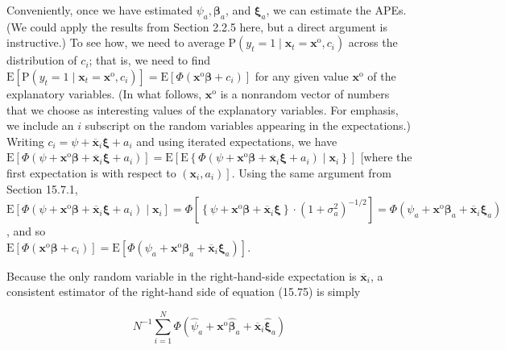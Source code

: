\documentclass[10pt]{article}
\begin{document}
Conveniently, once we have estimated $\psi_{a}, \boldsymbol{\beta}_{a}$, and $\boldsymbol{\xi}_{a}$, we can estimate the APEs. (We could apply the results from Section 2.2.5 here, but a direct argument is instructive.) To see how, we need to average $\mathrm{P}\left(y_{t}=1 \mid \mathbf{x}_{t}=\mathbf{x}^{\mathrm{o}}, c_{i}\right)$ across the distribution of $c_{i}$; that is, we need to find $\mathrm{E}\left[\mathrm{P}\left(y_{t}=1 \mid \mathbf{x}_{t}=\mathbf{x}^{\mathrm{o}}, c_{i}\right)\right]=\mathrm{E}\left[\Phi\left(\mathbf{x}^{\mathrm{o}} \boldsymbol{\beta}+c_{i}\right)\right]$ for any given value $\mathbf{x}^{\mathrm{o}}$ of the explanatory variables. (In what follows, $\mathbf{x}^{\mathrm{o}}$ is a nonrandom vector of numbers that we choose as interesting values of the explanatory variables. For emphasis, we include an $i$ subscript on the random variables appearing in the expectations.) Writing $c_{i}=\psi+\overline{\mathbf{x}}_{i} \boldsymbol{\xi}+a_{i}$ and using iterated expectations, we have $\mathrm{E}\left[\Phi\left(\psi+\mathbf{x}^{\mathrm{o}} \boldsymbol{\beta}+\overline{\mathbf{x}}_{i} \boldsymbol{\xi}+a_{i}\right)\right]=\mathrm{E}\left[\mathrm{E}\left\{\Phi\left(\psi+\mathbf{x}^{\mathrm{o}} \boldsymbol{\beta}+\overline{\mathbf{x}}_{i} \boldsymbol{\xi}+a_{i}\right) \mid \mathbf{x}_{i}\right\}\right]$ [where the first expectation is with respect to $\left.\left(\mathbf{x}_{i}, a_{i}\right)\right]$. Using the same argument from Section 15.7.1, $\mathrm{E}\left[\Phi\left(\psi+\mathbf{x}^{\mathrm{o}} \boldsymbol{\beta}+\overline{\mathbf{x}}_{i} \boldsymbol{\xi}+a_{i}\right) \mid \mathbf{x}_{i}\right]=\Phi\left[\left\{\psi+\mathbf{x}^{\mathrm{o}} \boldsymbol{\beta}+\overline{\mathbf{x}}_{i} \boldsymbol{\xi}\right\} \cdot\left(1+\sigma_{a}^{2}\right)^{-1 / 2}\right]=\Phi\left(\psi_{a}+\mathbf{x}^{\mathrm{o}} \boldsymbol{\beta}_{a}+\overline{\mathbf{x}}_{i} \boldsymbol{\xi}_{a}\right)$, and so\\
$\mathrm{E}\left[\Phi\left(\mathbf{x}^{\mathrm{o}} \boldsymbol{\beta}+c_{i}\right)\right]=\mathrm{E}\left[\Phi\left(\psi_{a}+\mathbf{x}^{\mathrm{o}} \boldsymbol{\beta}_{a}+\overline{\mathbf{x}}_{i} \boldsymbol{\xi}_{a}\right)\right]$.

Because the only random variable in the right-hand-side expectation is $\overline{\mathbf{x}}_{i}$, a consistent estimator of the right-hand side of equation (15.75) is simply


\begin{equation*}
N^{-1} \sum_{i=1}^{N} \Phi\left(\hat{\psi}_{a}+\mathbf{x}^{\mathrm{o}} \hat{\boldsymbol{\beta}}_{a}+\overline{\mathbf{x}}_{i} \hat{\boldsymbol{\xi}}_{a}\right) \tag{15.76}
\end{equation*}
\end{document}
